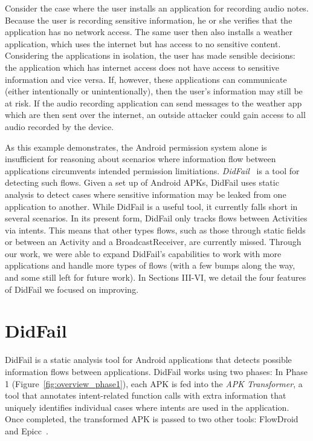 Consider the case where the user installs an application for recording audio notes. Because the user is recording sensitive information, he or she verifies that the application has no network access. The same user then also installs a weather application, which uses the internet but has access to no sensitive content. Considering the applications in isolation, the user has made sensible decisions: the application which has internet access does not have access to sensitive information and vice versa. If, however, these applications can communicate (either intentionally or unintentionally), then the user's information may still be at risk. If the audio recording application can send messages to the weather app which are then sent over the internet, an outside attacker could gain access to all audio recorded by the device.

As this example demonstrates, the Android permission system alone is insufficient for reasoning about scenarios where information flow between applications circumvents intended permission limitiations. \emph{DidFail}~\cite{didfail} is a tool for detecting such flows. Given a set up of Android APKs, DidFail uses static analysis to detect cases where sensitive information may be leaked from one application to another. While DidFail is a useful tool, it currently falls short in several scenarios. In its present form, DidFail only tracks flows between Activities via intents. This means that other types flows, such as those through static fields or between an Activity and a BroadcastReceiver, are currently missed. Through our work, we were able to expand DidFail's capabilities to work with more applications and handle more types of flows (with a few bumps along the way, and some still left for future work). In Sections III-VI, we detail the four features of DidFail we focused on improving.

\section{DidFail}

DidFail is a static analysis tool for Android applications that detects possible information flows between applications. DidFail works using two phases: In Phase 1 (Figure~\ref{fig:overview_phase1}), each APK is fed into the \emph{APK Transformer}, a tool that annotates intent-related function calls with extra information that uniquely identifies individual cases where intents are used in the application. Once completed, the transformed APK is passed to two other tools: FlowDroid~\cite{flowdroid} and Epicc~\cite{epicc}.

